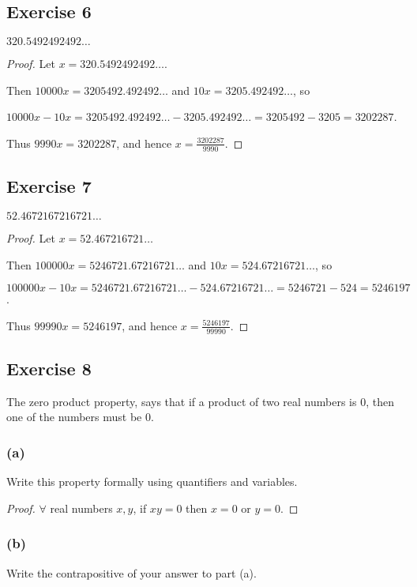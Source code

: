 \documentclass[14pt]{extarticle}
\newcommand{\fa}{\forall}
\begin{document}
\subsection{Exercise 6}
$320.5492492492\ldots$

\begin{proof}
    Let $x = 320.5492492492\ldots$.

    Then $10000x = 3205492.492492\ldots$ and $10x = 3205.492492\ldots$, so

    $10000x - 10x = 3205492.492492 \ldots - 3205.492492\ldots = 3205492 - 3205 = 3202287$.

    Thus $9990x = 3202287$, and hence $x = \frac{3202287}{9990}$.
\end{proof}

\subsection{Exercise 7}
$52.4672167216721\ldots$

\begin{proof}
    Let $x = 52.467216721\ldots$

    Then $100000x = 5246721.67216721\ldots$ and $10x = 524.67216721\ldots$, so

    $100000x - 10x = 5246721.67216721 \ldots - 524.67216721 \ldots = 5246721 - 524 = 5246197$.

    Thus $99990x = 5246197$, and hence $x = \frac{5246197}{99990}$.
\end{proof}

\subsection{Exercise 8}
The zero product property, says that if a product of two real numbers is 0, then one of the numbers must be 0.

\subsubsection{(a)}
Write this property formally using quantifiers and variables.

\begin{proof}
    $\fa$ real numbers $x, y$, if $xy = 0$ then $x = 0$ or $y = 0$.
\end{proof}

\subsubsection{(b)}
Write the contrapositive of your answer to part (a).
\end{document}
